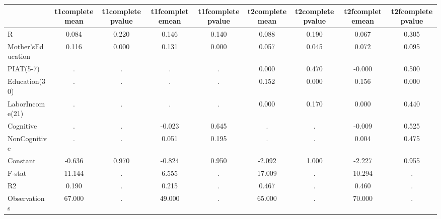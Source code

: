 \begin{table}[htbp]
\begin{tabular}{lcccccccc} \hline \hline
 & t1completemean  & t1completepvalue  & t1fcompletemean  & t1fcompletepvalue  & t2completemean  & t2completepvalue  & t2fcompletemean  & t2fcompletepvalue  \\  \hline 
R &     0.084 &     0.220 &     0.146 &     0.140 &     0.088 &     0.190 &     0.067 &     0.305 \\  
Mother'sEducation &     0.116 &     0.000 &     0.131 &     0.000 &     0.057 &     0.045 &     0.072 &     0.095 \\  
PIAT(5-7) &         . &         . &         . &         . &     0.000 &     0.470 &    -0.000 &     0.500 \\  
Education(30) &         . &         . &         . &         . &     0.152 &     0.000 &     0.156 &     0.000 \\  
LaborIncome(21) &         . &         . &         . &         . &     0.000 &     0.170 &     0.000 &     0.440 \\  
Cognitive &         . &         . &    -0.023 &     0.645 &         . &         . &    -0.009 &     0.525 \\  
NonCognitive &         . &         . &     0.051 &     0.195 &         . &         . &     0.004 &     0.475 \\  
Constant &    -0.636 &     0.970 &    -0.824 &     0.950 &    -2.092 &     1.000 &    -2.227 &     0.955 \\  
F-stat &    11.144 &         . &     6.555 &         . &    17.009 &         . &    10.294 &         . \\  
R2 &     0.190 &         . &     0.215 &         . &     0.467 &         . &     0.460 &         . \\  
Observations &    67.000 &         . &    49.000 &         . &    65.000 &         . &    70.000 &         . \\  
\hline \hline \end{tabular}
\end{table}

